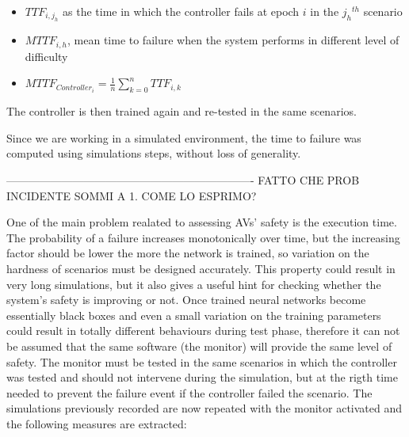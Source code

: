 \begin{itemize}
	\item $TTF_{i,j_{h}}$ as the time in which the controller fails at epoch $i$ in the ${j_{h}}^{th}$ scenario
	\item $MTTF_{i,h}$, mean time to failure when the system performs in different level of difficulty 
	\item $MTTF_{Controller_{i}} = \frac{1}{n} \sum_{k = 0}^{n} TTF_{i,k}$
\end{itemize}

The controller is then trained again and re-tested in the same scenarios. 

Since we are working in a simulated environment, the time to failure was computed using simulations steps, without loss of generality.\newline 

-------------------------------------------------------------------        FATTO CHE PROB INCIDENTE SOMMI A 1. COME LO ESPRIMO?\newline

One of the main problem realated to assessing AVs' safety is the execution time. The probability of a failure increases monotonically over time, but the increasing factor should be lower the more the network is trained, so variation on the hardness of scenarios must be designed accurately. This property could result in very long simulations, but it also gives a useful hint for checking whether the system's safety is improving or not. \newline\newline
Once trained neural networks become essentially black boxes and even a small variation on the training parameters could result in totally different behaviours during test phase, therefore it can not be assumed that the same software (the monitor) will provide the same level of safety.\newline
The monitor must be tested in the same scenarios in which the controller was tested and should not intervene during the simulation, but at the rigth time needed to prevent the failure event if the controller failed the scenario. The simulations previously recorded are now repeated with the monitor activated and the following measures are extracted:

